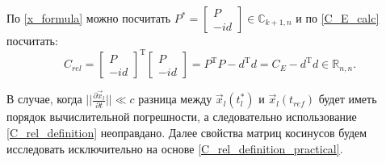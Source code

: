 По \ref{x_formula} можно посчитать $P^* = \begin{bmatrix} P \\ -id \end{bmatrix} \in \mathbb{C}_{k+1,n}$ и по \ref{C_E_calc} посчитать:
\begin{equation}
	C_{rel} = {\begin{bmatrix} P \\ -id \end{bmatrix}}^\mathrm{T}\begin{bmatrix} P \\ -id \end{bmatrix} = P^\mathrm{T}P - d^\mathrm{T}d = C_E - d^\mathrm{T}d \in \mathbb{R}_{n,n}.
	\label{C_rel_definition_practical}
\end{equation}

В случае, когда $||\frac{\partial{\vec{x}_l}}{\partial{t}}|| \ll c$ разница между $\vec{x}_l(t^*_l)$ и $\vec{x}_l(t_{ref})$ будет иметь порядок вычислительной погрешности, а следовательно  использование \ref{C_rel_definition} неоправдано. Далее свойства матриц косинусов будем исследовать исключительно на основе \ref{C_rel_definition_practical}.

